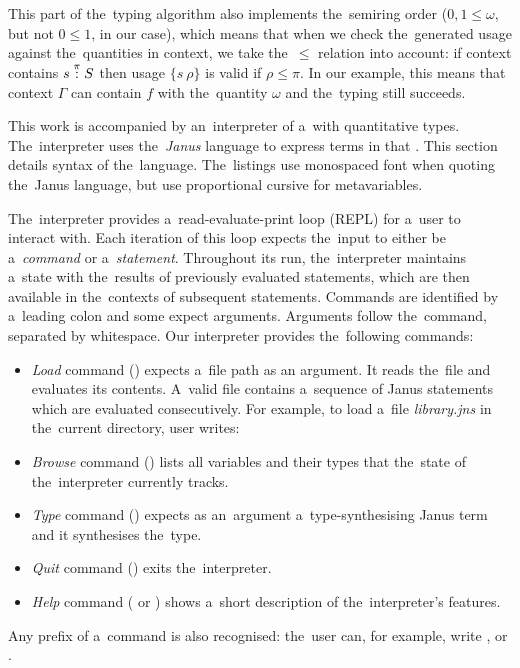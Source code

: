 This part of the~typing algorithm also implements the~semiring order
($0, 1 \leq \omega$, but not $0 \leq 1$, in our case), which means that when we
check the~generated usage against the~quantities in context, we take the~$\leq$
relation into account: if context contains $s \overset{\pi}: S$ then usage
$\{s \: \rho\}$ is valid if $\rho \leq \pi$. In our example, this means that
context $\Gamma$ can contain $f$ with the~quantity $\omega$ and the~typing still
succeeds.


This work is accompanied by an~interpreter of a~\lc with quantitative types.
The~interpreter uses the~\emph{Janus} language to express terms in that \lc.
This section details syntax of the~language. The~listings use monospaced font
when quoting the~Janus language, but use proportional cursive for metavariables.

The~interpreter provides a~read-evaluate-print loop (REPL) for a~user to
interact with. Each iteration of this loop expects the~input to either be
a~\emph{command} or a~\emph{statement}. Throughout its run, the~interpreter
maintains a~state with the~results of previously evaluated statements, which are
then available in the~contexts of subsequent statements. Commands are identified
by a~leading colon and some expect arguments. Arguments follow the~command,
separated by whitespace. Our interpreter provides the~following commands:
\begin{itemize}
  \item \emph{Load} command () expects a~file path as an argument.
    It reads the~file and evaluates its contents. A~valid file contains
    a~sequence of Janus statements which are evaluated consecutively. For
    example, to load a~file \emph{library.jns} in the~current directory, user
    writes:
    \begin{center}
    \end{center}
  \item \emph{Browse} command () lists all variables and their
    types that the~state of the~interpreter currently tracks.
  \item \emph{Type} command () expects as an~argument
    a~type-synthesising Janus term and it synthesises the~type.
  \item \emph{Quit} command () exits the~interpreter.
  \item \emph{Help} command ( or ) shows a~short
    description of the~interpreter's features.
\end{itemize}
Any prefix of a~command is also recognised: the~user can, for example, write
, or .

